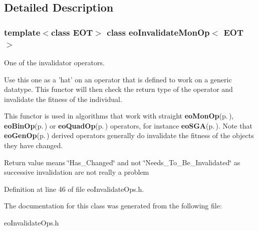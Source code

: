 \subsection{Detailed Description}
\subsubsection*{template$<$class EOT$>$ class eo\-Invalidate\-Mon\-Op$<$ EOT $>$}

One of the invalidator operators. 

Use this one as a 'hat' on an operator that is defined to work on a generic datatype. This functor will then check the return type of the operator and invalidate the fitness of the individual.

This functor is used in algorithms that work with straight {\bf eo\-Mon\-Op}{\rm (p.\,\pageref{classeo_mon_op})}, {\bf eo\-Bin\-Op}{\rm (p.\,\pageref{classeo_bin_op})} or {\bf eo\-Quad\-Op}{\rm (p.\,\pageref{classeo_quad_op})} operators, for instance {\bf eo\-SGA}{\rm (p.\,\pageref{classeo_s_g_a})}. Note that {\bf eo\-Gen\-Op}{\rm (p.\,\pageref{classeo_gen_op})} derived operators generally do invalidate the fitness of the objects they have changed.

Return value means \char`\"{}Has\_\-Changed\char`\"{} and not \char`\"{}Needs\_\-To\_\-Be\_\-Invalidated\char`\"{} as successive invalidation are not really a problem 



Definition at line 46 of file eo\-Invalidate\-Ops.h.

The documentation for this class was generated from the following file:\begin{CompactItemize}
\item 
eo\-Invalidate\-Ops.h\end{CompactItemize}

